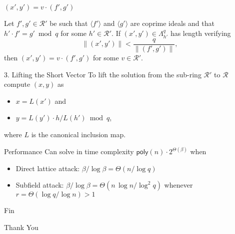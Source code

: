 \documentclass[presentation,smaller]{beamer}
\newcommand{\cR}{\ensuremath{\mathcal{R}}\xspace}
\begin{document}
\begin{frame}[label={sec:org3e33e14}]{\((x',y') = v ⋅ (f',g')\)}
\begin{theorem}
Let \(f',g' \in \cR'\) be such that \(⟨ f'⟩\) and \(⟨ g'⟩\) are coprime ideals and that \(h'⋅ f' = g' \bmod q\) for some \(h' \in \cR'\). If \((x',y') \in Λ_{h'}^q\) has length verifying
\[\|(x',y') \| < \frac q {\|(f',g')\|},\]
then \((x',y') = v ⋅ (f',g')\) for some \(v ∈ \cR'\).
\end{theorem}
\end{frame}

\begin{frame}[label={sec:orgbfcf50a}]{3. Lifting the Short Vector}
To lift the solution from the sub-ring \(\cR'\) to \(\cR\) compute \((x,y)\) as
\begin{itemize}
\item \(x = L(x')\)  and
\item \(y = L(y') ⋅ h / L(h') \bmod q\),
\end{itemize}
where \(L\) is the canonical inclusion map.
\end{frame}

\begin{frame}[label={sec:org500624a}]{Performance}
Can solve in time complexity \(\mathsf{poly}(n ) \cdot 2^{\Theta(\beta)}\) when

\begin{itemize}[<+->]
\item \alert{Direct lattice attack}: \(\beta / \log \beta = \Theta\left( n / \log q \right)\)
\item \alert{Subfield attack}: \(\beta / \log \beta = \Theta\left( n\, \log n / \log^2 q \right)\) whenever \(r = \Theta(\log q / \log n) > 1\)
\end{itemize}
\end{frame}


\begin{frame}[standout,label={sec:orgb817750}]{Fin}
\begin{center}
\Huge \alert{Thank You}
\end{center}
\end{frame}
\end{document}
